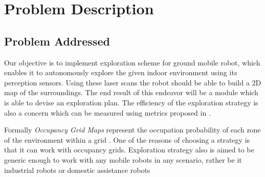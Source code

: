 \section{Problem Description}

\subsection{Problem Addressed}
Our objective is to implement exploration scheme for ground mobile robot, which enables it to
autonomously explore the given indoor environment using its perception sensors.
Using these laser scans the robot should be able to build a 2D map of the surroundings.
The end result of this endeavor will be a module which is able to devise an exploration plan.
The efficiency of the exploration strategy is also a concern which can be measured using metrics
proposed in \cite{Yan2015}.
\par
Formally \textit{Occupancy Grid Maps} represent the occupation probability of each zone of the
environment within a grid \cite{Juliae2012}. One of the reasons of choosing a strategy is that
it can work with occupancy grids. Exploration strategy also is aimed to be generic enough to work
with any mobile robots in any scenario, rather be it industrial robots or domestic assistance robots


